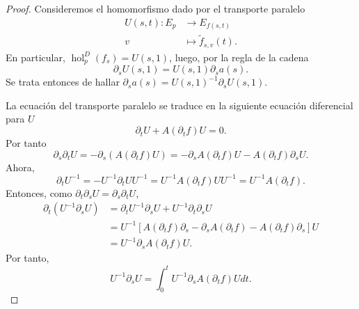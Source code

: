 \documentclass[12pt,a4paper]{article}
\theoremstyle{definition} \newtheorem{defn}[thm]{Definición}
\theoremstyle{definition} \newtheorem{ejemplo}[thm]{Ejemplo}
\theoremstyle{definition} \newtheorem{ejercicio}[thm]{Ejercicio}
\DeclareMathOperator{\hol}{hol}
\begin{document}
	  \begin{proof}
	    Consideremos el homomorfismo dado por el transporte paralelo
	    \begin{align*}
	      U(s,t): E_p &\longrightarrow E_{f(s,t)}\\ 
	      v &\longmapsto \tilde{f}_{s,v}(t). 
	      \end{align*}
	      En particular, $\hol^D_p(f_s) = U(s,1)$, luego, por la regla de la cadena
	      \begin{equation*}
		\partial_s U(s,1) = U(s,1) \partial_s a(s).
	      \end{equation*}
	      Se trata entonces de hallar $\partial_s a(s) = U(s,1)^{-1} \partial_s U(s,1)$.

	      La ecuación del transporte paralelo se traduce en la siguiente ecuación diferencial para $U$
	      \begin{equation*}
		\partial_t U + A(\partial_t f) U = 0.
	      \end{equation*}
	      Por tanto
	      \begin{equation*}
    	\partial_s \partial_t U = -\partial_s (A(\partial_t f) U) = -\partial_s A(\partial_t f) U - A(\partial_t f) \partial_s U.
	      \end{equation*}
	      Ahora, 
	      \begin{equation*}
		\partial_t U^{-1} = - U^{-1} \partial_t U U^{-1}  = U^{-1} A(\partial_t f) U U^{-1} = U^{-1} A(\partial_t f).
	      \end{equation*}
	      Entonces, como $\partial_t \partial_s U = \partial_s \partial_t U$,
	      \begin{align*}
		\partial_t(U^{-1} \partial_s U) &= \partial_t U^{-1} \partial_s U + U^{-1} \partial_t\partial_s U \\ & = U^{-1}[ A(\partial_t f) \partial_s  - \partial_s A(\partial_t f)  - A(\partial_t f) \partial_s] U \\
		&= U^{-1} \partial_s A(\partial_t f) U.
	      \end{align*}
	      Por tanto,
	      \begin{equation*}
		U^{-1} \partial_s U = \int_0^t U^{-1} \partial_s A(\partial_t f) U dt.
	      \end{equation*}
	      

\end{proof}
\end{document}
